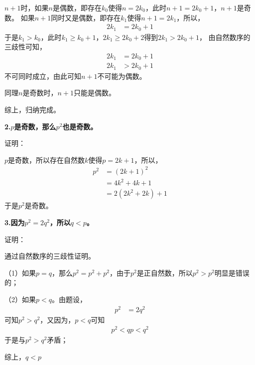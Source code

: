 \documentclass{article}
\theoremstyle{mystyle}
\begin{document}
$n+1$时，如果$n$是偶数，即存在$k_0$使得$n=2k_0$，此时$n+1=2k_0+1$，$n+1$是奇数。
如果$n+1$同时又是偶数，即存在$k_1$使得$n+1=2k_1$，所以，
\begin{align*}
  2k_1 & = 2k_0 + 1
\end{align*}
于是$k_1 > k_0$，此时$k_1 \geq k_0+1$，$2k_1 \geq 2k_0 + 2$得到$2k_1 > 2k_0 + 1$，
由自然数序的三歧性可知，
\begin{align}
  2k_1 & = 2k_0 + 1 \\
  2k_1 & > 2k_0 + 1
\end{align}
不可同时成立，由此可知$n+1$不可能为偶数。

同理$n$是奇数时，$n+1$只能是偶数。

综上，归纳完成。

\textbf{2.$p$是奇数，那么$p^2$也是奇数。}

证明：

$p$是奇数，所以存在自然数$k$使得$p=2k+1$，所以，
\begin{align*}
  p^2 & = (2k+1)^2         \\
      & = 4k^2 + 4k + 1    \\
      & = 2(2k^2 + 2k) + 1
\end{align*}
于是$p^2$是奇数。


\textbf{3.因为$p^2 = 2q^2$，所以$q<p$。}

证明：

通过自然数序的三歧性证明。

（1）如果$p=q$，那么$p^2=p^2+p^2$，由于$p^2$是正自然数，所以$p^2>p^2$明显是错误的；

（2）如果$p<q$。由题设，
\begin{align*}
  p^2 & = 2q^2
\end{align*}
可知$p^2 > q^2$，又因为，$p<q$可知
\begin{align*}
  p^2 < qp < q^2
\end{align*}
于是与$p^2 > q^2$矛盾；

综上，$q<p$
\end{document}
